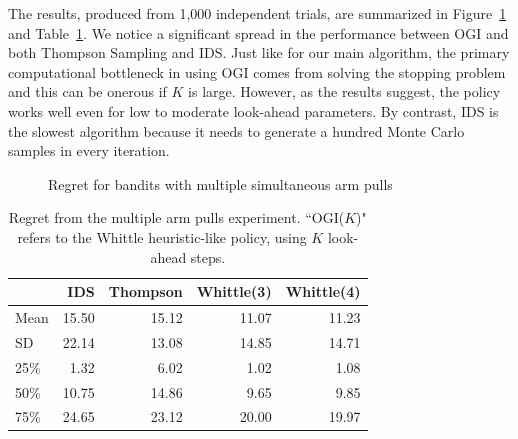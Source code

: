 The results, produced from 1,000 independent trials, are summarized in Figure~\ref{fig:restless1} and Table~\ref{table:restless1_summary}. We notice a significant spread in the performance between OGI and both Thompson Sampling and IDS. Just like for our main algorithm, the primary computational bottleneck in using OGI comes from solving the stopping problem and this can be onerous if $K$ is large. However, as the results suggest, the policy works well even for low to moderate look-ahead parameters. By contrast, IDS is the slowest algorithm because it needs to generate a hundred Monte Carlo samples in every iteration.
\begin{figure}
	\centering
	
	\caption{Regret for bandits with multiple simultaneous arm pulls}
	\label{fig:restless1}
\end{figure}

\begin{table}
	\centering
	\begin{tabular}{lrrrr}
		\toprule
		{} &   IDS &  Thompson &  Whittle(3) &  Whittle(4) \\
		\midrule
		Mean      & 15.50 &     15.12 &       11.07 &       11.23 \\
		SD       & 22.14 &     13.08 &       14.85 &       14.71 \\
		25\% &  1.32 &      6.02 &        1.02 &        1.08 \\
		50\%    & 10.75 &     14.86 &        9.65 &        9.85 \\
		75\% & 24.65 &     23.12 &       20.00 &       19.97 \\
		\bottomrule
	\end{tabular}
	
	\caption{Regret from the multiple arm pulls experiment. ``OGI($K$)" refers to the Whittle heuristic-like policy, using $K$ look-ahead steps.}
	\label{table:restless1_summary}
\end{table}
